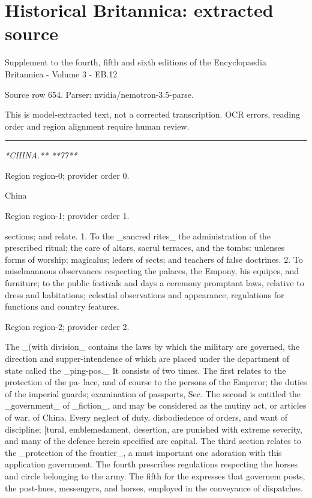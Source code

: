 \documentclass[11pt]{article}
\begin{document}
\section*{Historical Britannica: extracted source}
Supplement to the fourth, fifth and sixth editions of the Encyclopaedia Britannica - Volume 3 - EB.12\par
{\small Source row 654. Parser: nvidia/nemotron-3.5-parse.\par}
{\small This is model-extracted text, not a corrected transcription. OCR errors, reading order and region alignment require human review.\par}
\hrule\medskip
{\small\itshape **CHINA.** **77**\par}

{\scriptsize\color{gray} Region region-0; provider order 0.\par}
\medskip

China
\par

{\scriptsize\color{gray} Region region-1; provider order 1.\par}
\medskip

sections; and relate. 1. To the \_sancred rites\_ the administration of the prescribed ritual; the care of altars, sacrul terraces, and the tombs: unlenses forms of worship; magicalus; leders of sects; and teachers of false doctrines. 2. To miselmannous observances respecting the palaces, the Empony, his equipes, and furniture; to the public festivals and days a ceremony promptant laws, relative to dress and habitations; celestial observations and appearance, regulations for functions and country features.
\par

{\scriptsize\color{gray} Region region-2; provider order 2.\par}
\medskip

The \_(with division\_ contains the laws by which the military are governed, the direction and supper-intendence of which are placed under the department of state called the \_ping-pos.\_ It consists of two times. The first relates to the protection of the pa- lace, and of course to the persons of the Emperor; the duties of the imperial guards; examination of passports, Sec. The second is entitled the \_government\_ of \_fiction\_, and may be considered as the mutiny act, or articles of war, of China. Every neglect of duty, disbodiedence of orders, and want of discipline; [tural, emblemedament, desertion, are punished with extreme severity, and many of the defence herein specified are capital. The third section relates to the \_protection of the frontier\_, a must important one adoration with this application government. The fourth prescribes regulations respecting the horses and circle belonging to the army. The fifth for the expresses that governem posts, the post-hues, messengers, and horses, employed in the conveyance of dispatches.
\par
\end{document}
